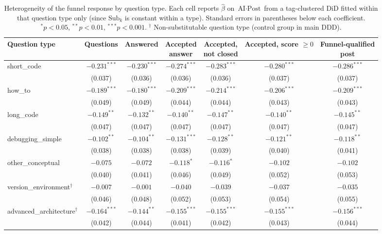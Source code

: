 \begin{table}[ht]
\centering
\caption{Heterogeneity of the funnel response by question type. Each
cell reports $\hat\beta$ on $\text{AI}\cdot\text{Post}$ from a
tag-clustered DiD fitted within that question type only (since
$\text{Sub}_k$ is constant within a type). Standard errors in
parentheses below each coefficient. $^{*} p<0.05$, $^{**} p<0.01$,
$^{***} p<0.001$. $^\dagger$ Non-substitutable question type (control
group in main DDD).}
\label{tab:funnel_heterogeneity_by_qtype}
\footnotesize
\setlength{\tabcolsep}{4pt}
\begin{adjustbox}{max width=\textwidth}
\begin{tabular}{lcccccc}
\toprule
Question type & Questions & Answered &
  \makecell{Accepted\\answer} & \makecell{Accepted,\\not closed} &
  \makecell{Accepted,\\score $\geq 0$} & \makecell{Funnel-qualified\\post} \\
\midrule
short\_code
 & $-0.231^{***}$ & $-0.230^{***}$ & $-0.274^{***}$ & $-0.283^{***}$ & $-0.280^{***}$ & $-0.286^{***}$ \\
 & (0.037) & (0.036) & (0.036) & (0.036) & (0.037) & (0.037) \\
how\_to
 & $-0.189^{***}$ & $-0.180^{***}$ & $-0.209^{***}$ & $-0.214^{***}$ & $-0.206^{***}$ & $-0.209^{***}$ \\
 & (0.049) & (0.049) & (0.044) & (0.044) & (0.043) & (0.043) \\
long\_code
 & $-0.149^{**}$ & $-0.132^{**}$ & $-0.140^{**}$ & $-0.147^{**}$ & $-0.140^{**}$ & $-0.145^{**}$ \\
 & (0.047) & (0.047) & (0.047) & (0.047) & (0.047) & (0.047) \\
debugging\_simple
 & $-0.102^{**}$ & $-0.104^{**}$ & $-0.131^{***}$ & $-0.128^{**}$ & $-0.121^{**}$ & $-0.118^{**}$ \\
 & (0.038) & (0.038) & (0.038) & (0.039) & (0.040) & (0.041) \\
other\_conceptual
 & $-0.075$ & $-0.072$ & $-0.118^{*}$ & $-0.116^{*}$ & $-0.102$ & $-0.102$ \\
 & (0.040) & (0.041) & (0.046) & (0.049) & (0.052) & (0.053) \\
version\_environment$^\dagger$
 & $-0.007$ & $-0.001$ & $-0.040$ & $-0.039$ & $-0.037$ & $-0.035$ \\
 & (0.046) & (0.048) & (0.052) & (0.053) & (0.054) & (0.055) \\
advanced\_architecture$^\dagger$
 & $-0.164^{***}$ & $-0.144^{**}$ & $-0.155^{***}$ & $-0.155^{***}$ & $-0.155^{***}$ & $-0.156^{***}$ \\
 & (0.042) & (0.044) & (0.041) & (0.042) & (0.043) & (0.044) \\
\bottomrule
\end{tabular}
\end{adjustbox}
\end{table}
